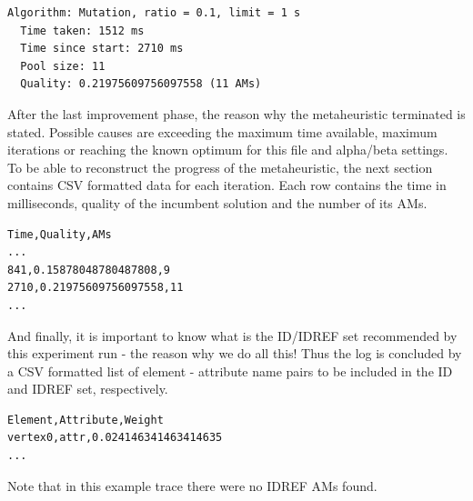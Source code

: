 \documentclass[a4paper,12pt,oneside]{report}
\begin{document}
\begin{footnotesize}
\begin{verbatim}
Algorithm: Mutation, ratio = 0.1, limit = 1 s
  Time taken: 1512 ms
  Time since start: 2710 ms
  Pool size: 11
  Quality: 0.21975609756097558 (11 AMs)
\end{verbatim}
\end{footnotesize}

After the last improvement phase, the reason why the metaheuristic terminated is stated. Possible causes are exceeding the maximum time available, maximum iterations or reaching the known optimum for this file and alpha/beta settings.
\\

To be able to reconstruct the progress of the metaheuristic, the next section contains CSV  formatted data for each iteration. Each row contains the time in milliseconds, quality of the incumbent solution and the number of its AMs.

\begin{footnotesize}
\begin{verbatim}
Time,Quality,AMs
...
841,0.15878048780487808,9
2710,0.21975609756097558,11
...
\end{verbatim}
\end{footnotesize}

And finally, it is important to know what is the ID/IDREF set recommended by this experiment run - the reason why we do all this! Thus the log is concluded by a CSV formatted list of element - attribute name pairs to be included in the ID and IDREF set, respectively.

\begin{footnotesize}
\begin{verbatim}
Element,Attribute,Weight
vertex0,attr,0.024146341463414635
...
\end{verbatim}
\end{footnotesize}

Note that in this example trace there were no IDREF AMs found.
\end{document}
